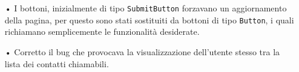 {{\begin{itemize}
		\item[•] I bottoni, inizialmente di tipo \texttt{SubmitButton} forzavano un aggiornamento della pagina, per questo sono stati sostituiti da bottoni di tipo \texttt{Button}, i quali richiamano semplicemente le funzionalità desiderate.
		
		\item[•] Corretto il bug che provocava la visualizzazione dell'utente stesso tra la lista dei contatti chiamabili.
	\end{itemize}		
	}
}